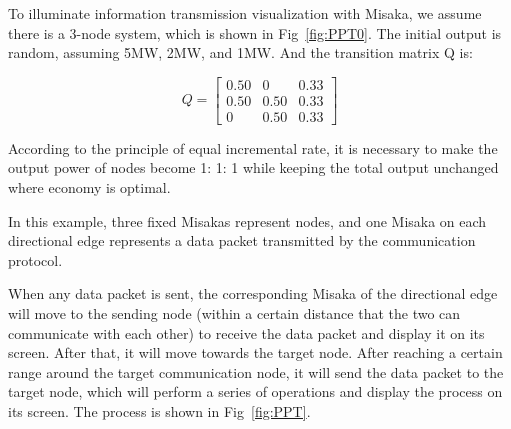 \documentclass[conference]{IEEEtran}
\begin{document}
To illuminate information transmission visualization with Misaka, we assume there is a 3-node system, which is shown in Fig~\ref{fig:PPT0}. The initial output is random, assuming 5MW, 2MW, and 1MW. And the transition matrix Q is:

\begin{equation}
    Q=\left[\begin{array}{ccc}
    0.50 & 0 & 0.33 \\
    0.50 & 0.50 & 0.33 \\
    0 & 0.50 & 0.33
    \end{array}\right]
\end{equation}

According to the principle of equal incremental rate, it is necessary to make the output power of nodes become 1: 1: 1 while keeping the total output unchanged where economy is optimal.

In this example, three fixed Misakas represent nodes, and one Misaka on each directional edge represents a data packet transmitted by the communication protocol.

When any data packet is sent, the corresponding Misaka of the directional edge will move to the sending node (within a certain distance that the two can communicate with each other) to receive the data packet and display it on its screen. After that, it will move towards the target node. After reaching a certain range around the target communication node, it will send the data packet to the target node, which will perform a series of operations and display the process on its screen. The process is shown in Fig~\ref{fig:PPT}.
\end{document}
